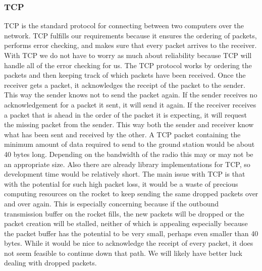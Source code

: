 \documentclass[onecolumn, draftclsnofoot,10pt, compsoc]{IEEEtran}
\begin{document}
\subsubsection{TCP}
TCP is the standard protocol for connecting between two computers over the network.
TCP fulfills our requirements because it ensures the ordering of packets, performs error checking, and makes sure that every packet arrives to the receiver.
With TCP we do not have to worry as much about reliability because TCP will handle all of the error checking for us.
The TCP protocol works by ordering the packets and then keeping track of which packets have been received.
Once the receiver gets a packet, it acknowledges the receipt of the packet to the sender.
This way the sender knows not to send the packet again.
If the sender receives no acknowledgement for a packet it sent, it will send it again.
If the receiver receives a packet that is ahead in the order of the packet it is expecting, it will request the missing packet from the sender.
This way both the sender and receiver know what has been sent and received by the other.
A TCP packet containing the minimum amount of data required to send to the ground station would be about 40 bytes long.
Depending on the bandwidth of the radio this may or may not be an appropriate size.
Also there are already library implementations for TCP, so development time would be relatively short.
The main issue with TCP is that with the potential for such high packet loss, it would be a waste of precious computing resources on the rocket to keep sending the same dropped packets over and over again.
This is especially concerning because if the outbound transmission buffer on the rocket fills, the new packets will be dropped or the packet creation will be stalled, neither of which is appealing especially because the packet buffer has the potential to be very small, perhaps even smaller than 40 bytes.
While it would be nice to acknowledge the receipt of every packet, it does not seem feasible to continue down that path.
We will likely have better luck dealing with dropped packets.
\end{document}
